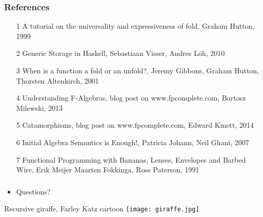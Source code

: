 \documentclass[10pt]{beamer}
\begin{document}
\begin{frame}[fragile]
\frametitle{References}

\begin{itemize}
\item [1] A tutorial on the universality and expressiveness of fold, Graham Hutton, 1999
\item [2] Generic Storage in Haskell, Sebastiaan Visser, Andres Löh, 2010
\item [3] When is a function a fold or an unfold?, Jeremy Gibbons, Graham Hutton, Thorsten Altenkirch, 2001
\item [4] Understanding F-Algebras, blog post on www.fpcomplete.com, Bartosz Milewski, 2013
\item [5] Catamorphisms, blog post on www.fpcomplete.com, Edward Kmett, 2014
\item [6] Initial Algebra Semantics is Enough!, Patricia Johann, Neil Ghani, 2007
\item [7] Functional Programming with Bananas, Lenses, Envelopes and Barbed Wire, Erik Meijer Maarten Fokkinga, Ross Paterson, 1991
\end{itemize}

\end{frame}




\begin{frame}[fragile]
\frametitle{}

\begin{itemize}
\item Questions?
\end{itemize}

\begin{block}{Recursive giraffe, Farley Katz cartoon }
\texttt{[image: giraffe.jpg]}	
\end{block}
\end{frame}
\end{document}
